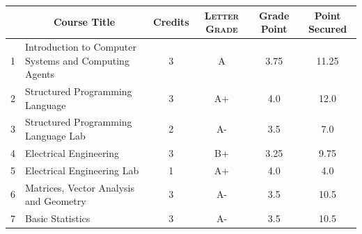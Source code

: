 \documentclass[11pt]{article}
\newcommand*{\numtwo}[1]{\pgfmathprintnumber[
                    fixed, precision=2, fixed zerofill=true]{#1}}
\begin{document}
                \begin{center}
                    \renewcommand{\arraystretch}{1.08}
                    
                \begin{tabular}{|c|l|c|>{\scshape}c|c|c|}
                \hline  \rule[-1ex]{0pt}{3.5ex} {\centering{\bf Course Code}} &  \multicolumn{1}{c|}{\textbf{Course Title}}  & {\bf Credits} & {\bf Letter Grade} & {\bf Grade Point} & {\bf Point Secured}  \\ 
                \hline   1 &  Introduction to Computer Systems and Computing Agents		 & 3 & A & 3.75 & 11.25 \\ %
                \hline   2 &  Structured Programming Language		 & 3 & A+ & 4.0 & 12.0 \\ %
                \hline   3 &  Structured Programming Language Lab		 & 2 & A- & 3.5 & 7.0 \\ %
                \hline   4 &  Electrical Engineering		 & 3 & B+ & 3.25 & 9.75 \\ %
                \hline   5 &  Electrical Engineering Lab		 & 1 & A+ & 4.0 & 4.0 \\ %
                \hline   6 &  Matrices, Vector Analysis and Geometry		 & 3 & A- & 3.5 & 10.5 \\ %
                \hline   7 &  Basic Statistics		 & 3 & A- & 3.5 & 10.5 \\ %

\hline                %
                \end{tabular}
                \end{center}
                \renewcommand{\arraystretch}{1.03}
\end{document}
